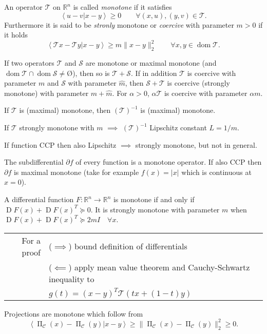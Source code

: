 \documentclass[varwidth=15cm, border=.5cm]{standalone}
\DeclareMathOperator{\jacobian}{D}
\DeclareMathOperator{\proj}{\Pi}
\DeclareMathOperator{\domain}{dom}
\newcommand*\from{\colon}
\newcommand{\innerp}[2]{\left\langle #1 \vert #2 \right\rangle}
\renewcommand*{\emptyset}{\text{\O}}
\begin{document}
\begin{definition}[label=1_xd5vw5, name=Monotone Operators and Coercivity]
	An operator \(\mathcal T\) on \(\mathbb R^n\) is called \textit{monotone} if it satisfies
	\[
		\innerp{u-v}{x-y} \geq 0\qquad\forall(x,u), (y,v)\in\mathcal T.
	\]
	Furthermore it is said to be \textit{stronly} monotone or \textit{coercive} with
	parameter \( m > 0\) if it holds
	\[
		\innerp{\mathcal T x- \mathcal T y}{x-y}\geq m\lVert x -
		y\rVert^2_2 \qquad \forall x,y\in\domain\mathcal T.
	\]

	If two operators \(\mathcal T\) and \(\mathcal S\) are monotone or maximal monotone (and 
	\(\domain\mathcal T\cap\domain\mathcal S \neq \emptyset \)), then so is \(\mathcal T + \mathcal S\). If in addition \(\mathcal T\) is coercive
	with parameter \(m\) and \(\mathcal S\) with parameter \(\hat{m}\), then \(\mathcal S + \mathcal T\) is coercive 
	(strongly monotone) with parameter \(m+\hat{m}\). For \(\alpha>0\), \(\alpha\mathcal T\) is coercive 
	with parameter \(\alpha m\).

	\begin{remark}[label=dmtwtj_m, name=Inverse Connection to Lipschitz]
		If \(\mathcal T\) is (maximal) monotone, then \((\mathcal T)^{-1}\) is (maximal) monotone.

		If \(\mathcal T\) strongly monotone with \(m\) \(\implies\) \((\mathcal T)^{-1}\) Lipschitz constant \(L=1/m\).

		If function CCP then also Lipschitz \(\implies\) strongly
		monotone, but not in general.
	\end{remark}

	\begin{remark}[label=8rp83gxt, name=Subdifferential operator]
		The subdifferential \(\partial f\) of every function is a
		monotone operator. If also CCP then \(\partial f\) is maximal
		monotone (take for example \(f(x) = |x|\) which is continuous at
		\(x = 0\)).
	\end{remark}

	\begin{example}[label=ui6ez2bq, name=Differentiable Function]
		A differential function \(F\from\mathbb R^n\to\mathbb R^n\) is monotone
		if and only if \(\jacobian F(x) + \jacobian F(x)^T \succeq 0\). It is
		strongly monotone with parameter \(m\) when \(\jacobian F(x) + \jacobian
		F(x)^T\succeq 2mI\quad\forall x\).
		\begin{tabular}{rl}
			For a proof & (\( \implies \)) bound definition of differentials \\
				    & (\( \impliedby \)) apply mean value
				    theorem and Cauchy-Schwartz inequality to \\
				    &\quad\(g(t) = (x - y)^T\mathcal T(tx +
				    (1-t) y) \)
		\end{tabular}
	\end{example}
	\begin{example}[label=vuj2l97d, name=Projections]
		Projections are monotone which follow from
		\[
			\innerp{\proj_{\mathcal C}(x) - \proj_{\mathcal C}(y)}{x-y} \geq \lVert\proj_{\mathcal C}(x) - \proj_{\mathcal C}(y)\lVert^2_2 \geq 0.
		\]
	\end{example}
\end{definition}
\end{document}
